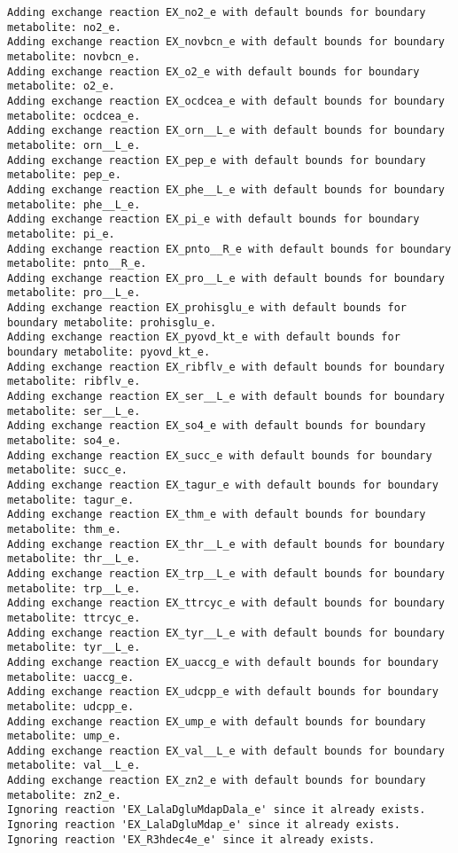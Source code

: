 \documentclass[
  letterpaper,
  DIV=11,
  numbers=noendperiod]{scrartcl}
\begin{document}
\begin{verbatim}
Adding exchange reaction EX_no2_e with default bounds for boundary metabolite: no2_e.
Adding exchange reaction EX_novbcn_e with default bounds for boundary metabolite: novbcn_e.
Adding exchange reaction EX_o2_e with default bounds for boundary metabolite: o2_e.
Adding exchange reaction EX_ocdcea_e with default bounds for boundary metabolite: ocdcea_e.
Adding exchange reaction EX_orn__L_e with default bounds for boundary metabolite: orn__L_e.
Adding exchange reaction EX_pep_e with default bounds for boundary metabolite: pep_e.
Adding exchange reaction EX_phe__L_e with default bounds for boundary metabolite: phe__L_e.
Adding exchange reaction EX_pi_e with default bounds for boundary metabolite: pi_e.
Adding exchange reaction EX_pnto__R_e with default bounds for boundary metabolite: pnto__R_e.
Adding exchange reaction EX_pro__L_e with default bounds for boundary metabolite: pro__L_e.
Adding exchange reaction EX_prohisglu_e with default bounds for boundary metabolite: prohisglu_e.
Adding exchange reaction EX_pyovd_kt_e with default bounds for boundary metabolite: pyovd_kt_e.
Adding exchange reaction EX_ribflv_e with default bounds for boundary metabolite: ribflv_e.
Adding exchange reaction EX_ser__L_e with default bounds for boundary metabolite: ser__L_e.
Adding exchange reaction EX_so4_e with default bounds for boundary metabolite: so4_e.
Adding exchange reaction EX_succ_e with default bounds for boundary metabolite: succ_e.
Adding exchange reaction EX_tagur_e with default bounds for boundary metabolite: tagur_e.
Adding exchange reaction EX_thm_e with default bounds for boundary metabolite: thm_e.
Adding exchange reaction EX_thr__L_e with default bounds for boundary metabolite: thr__L_e.
Adding exchange reaction EX_trp__L_e with default bounds for boundary metabolite: trp__L_e.
Adding exchange reaction EX_ttrcyc_e with default bounds for boundary metabolite: ttrcyc_e.
Adding exchange reaction EX_tyr__L_e with default bounds for boundary metabolite: tyr__L_e.
Adding exchange reaction EX_uaccg_e with default bounds for boundary metabolite: uaccg_e.
Adding exchange reaction EX_udcpp_e with default bounds for boundary metabolite: udcpp_e.
Adding exchange reaction EX_ump_e with default bounds for boundary metabolite: ump_e.
Adding exchange reaction EX_val__L_e with default bounds for boundary metabolite: val__L_e.
Adding exchange reaction EX_zn2_e with default bounds for boundary metabolite: zn2_e.
Ignoring reaction 'EX_LalaDgluMdapDala_e' since it already exists.
Ignoring reaction 'EX_LalaDgluMdap_e' since it already exists.
Ignoring reaction 'EX_R3hdec4e_e' since it already exists.

\end{verbatim}
\end{document}

